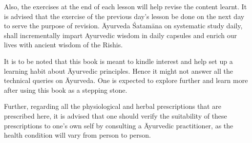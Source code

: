 Also, the exercises at the end of each lesson will help revise the content learnt. It is advised that the exercise of the previous day’s lesson be done on the next day to serve the purpose of revision.  Āyurveda Śatamāna on systematic study daily, shall incrementally impart Ayurvedic wisdom in daily capsules and enrich our lives with ancient wisdom of the Rishis.
\medskip


It is to be noted that this book is meant to kindle interest and help set up a learning habit about Āyurvedic principles. Hence it might not answer all the technical queries on Āyurveda. One is expected to explore further and learn more after using this book as a stepping stone.

Further, regarding all the physiological and herbal prescriptions that are prescribed here, it is advised that one should verify the suitability of these prescriptions to one’s own self by consulting a Āyurvedic practitioner, as the health condition will vary from person to person.
